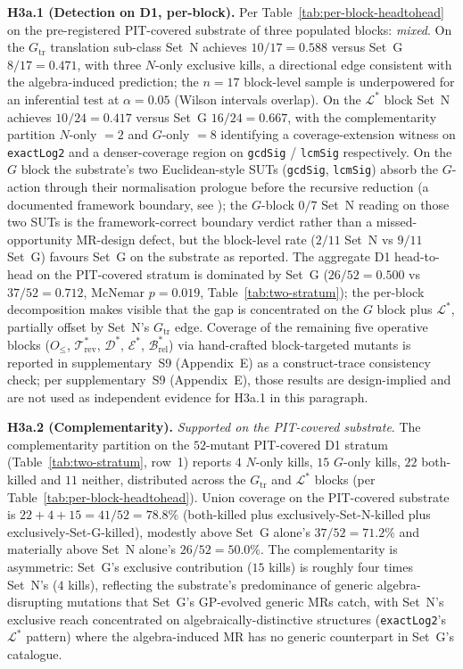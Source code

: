 \documentclass[manuscript]{acmart}
\begin{document}
\textbf{H3a.1 (Detection on D1, per-block).} Per
Table~\ref{tab:per-block-headtohead} on the pre-registered
PIT-covered substrate of three populated blocks: \emph{mixed}. On the
$G_{\mathrm{tr}}$ translation sub-class Set~N achieves $10/17 = 0.588$ versus
Set~G $8/17 = 0.471$, with three $N$-only exclusive kills, a
directional edge consistent with the algebra-induced prediction;
the $n = 17$ block-level sample is underpowered for an inferential
test at $\alpha = 0.05$ (Wilson intervals overlap). On the
$\mathcal{L}^{*}$ block Set~N achieves $10/24 = 0.417$ versus Set~G
$16/24 = 0.667$, with the complementarity partition $N$-only $= 2$
and $G$-only $= 8$ identifying a coverage-extension witness on
\texttt{exactLog2} and a denser-coverage region on \texttt{gcdSig}
/ \texttt{lcmSig} respectively. On the $G$ block the substrate's
two Euclidean-style SUTs (\texttt{gcdSig}, \texttt{lcmSig}) absorb
the $G$-action through their normalisation prologue before the
recursive reduction (a documented framework boundary, see
); the $G$-block $0/7$
Set~N reading on those two SUTs is the framework-correct boundary
verdict rather than a missed-opportunity MR-design defect, but the
block-level rate ($2/11$ Set~N vs $9/11$ Set~G) favours Set~G on
the substrate as reported. The aggregate D1 head-to-head on the
PIT-covered stratum is dominated by Set~G ($26/52 = 0.500$ vs
$37/52 = 0.712$, McNemar $p = 0.019$,
Table~\ref{tab:two-stratum}); the per-block decomposition makes
visible that the gap is concentrated on the $G$ block plus
$\mathcal{L}^{*}$, partially offset by Set~N's $G_{\mathrm{tr}}$
edge. Coverage of the remaining five operative blocks ($O_{\le}$,
$\mathcal{T}^{*}_{\mathrm{rev}}$, $\mathcal{D}^{*}$,
$\mathcal{E}^{*}$, $\mathcal{B}^{*}_{\mathrm{rel}}$) via
hand-crafted block-targeted mutants is reported in
supplementary~S9 (Appendix~E) as a construct-trace
consistency check; per supplementary~S9 (Appendix~E), those
results are design-implied and are not used as independent evidence
for H3a.1 in this paragraph.

\textbf{H3a.2 (Complementarity).} \emph{Supported on the PIT-covered
substrate}. The complementarity partition on the $52$-mutant
PIT-covered D1 stratum (Table~\ref{tab:two-stratum}, row~1) reports
$4$ $N$-only kills, $15$ $G$-only kills, $22$ both-killed and $11$
neither, distributed across the $G_{\mathrm{tr}}$ and
$\mathcal{L}^{*}$ blocks (per
Table~\ref{tab:per-block-headtohead}). Union coverage on the
PIT-covered substrate is $22 + 4 + 15 = 41 / 52 = 78.8\%$
(both-killed plus exclusively-Set-N-killed plus
exclusively-Set-G-killed), modestly above Set~G alone's
$37 / 52 = 71.2\%$ and materially above Set~N alone's
$26 / 52 = 50.0\%$. The complementarity is asymmetric: Set~G's
exclusive contribution ($15$ kills) is roughly four times Set~N's
($4$ kills), reflecting the substrate's predominance of generic
algebra-disrupting mutations that Set~G's GP-evolved generic MRs
catch, with Set~N's exclusive reach concentrated on
algebraically-distinctive structures (\texttt{exactLog2}'s
$\mathcal{L}^{*}$ pattern) where the algebra-induced MR has no
generic counterpart in Set~G's catalogue.
\end{document}
